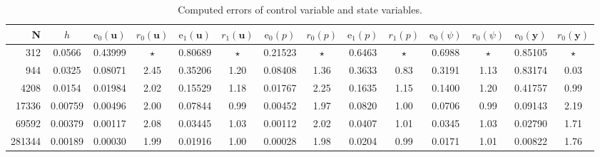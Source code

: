 \documentclass[smallextended]{svjour3}
\numberwithin{equation}{section}
\numberwithin{figure}{section}
\numberwithin{table}{section}
\newcommand\by{\boldsymbol{y}}
\newcommand\bu{\boldsymbol{u}}
\begin{document}
        \begin{table}[ht!]
			\setlength{\tabcolsep}{4.5pt}
			\centering 
			\caption{Computed errors of control variable and state variables.}
			{\small
					\begin{tabular}{|rc|cccc|cccc|cc|cc|} 
					\hline\hline
					N   &   $h$  & $\mathrm{e}_0(\bu)$  &   $r_0(\bu)$   &   $\mathrm{e}_1(\bu)$  &   $r_1(\bu)$  & $\mathrm{e}_0(p)$  &   $r_0(p)$   &   $\mathrm{e}_1(p)$  &   $r_1(p)$ & $\mathrm{e}_0(\psi)$  &   $r_0(\psi)$   &   $\mathrm{e}_0(\by)$  &   $r_0(\by)$ \\
					\hline 
312 & 0.0566 & 0.43999  &  $\star$ & 0.80689 &   $\star$ & 0.21523 &   $\star$ & 0.6463 &   $\star$ & 0.6988 &   $\star$ & 0.85105 &   $\star$ \\
944 & 0.0325 &  0.08071  &  2.45  &  0.35206   & 1.20  & 0.08408 &   1.36  &  0.3633   & 0.83 &  0.3191 &   1.13 &  0.83174  &  0.03 \\
4208 & 0.0154 & 0.01984  & 2.02 &  0.15529  &  1.18 & 0.01767 &   2.25  &  0.1635  &  1.15 &  0.1400 &  1.20 &  0.41757 & 0.99 
\\
17336 & 0.00759 & 0.00496  &  2.00  &  0.07844 &  0.99 &  0.00452 & 1.97 & 0.0820  &  1.00 &  0.0706 &  0.99 &  0.09143  &   2.19 \\
69592 & 0.00379 & 0.00117 & 2.08  &  0.03445  &  1.03 & 0.00112 &  2.02 & 0.0407 &  1.01 &  0.0345  & 1.03 &  0.02790 &  1.71 
\\
281344 & 0.00189 & 0.00030 & 1.99  &  0.01916  &  1.00 & 0.00028 & 1.98 & 0.0204 &  0.99 &  0.0171  & 1.01 & 0.00822 & 1.76 \\
					\hline
					\hline
			\end{tabular}}
			\smallskip			
			\label{table-Ex2}
		\end{table}
\end{document}

